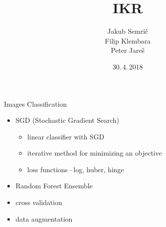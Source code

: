 \documentclass{beamer}
\title[]{IKR}
\author{Jakub Semrič \\ Filip Klembara \\ Peter Jareš}
\institute{Brno University of Technology \\ Faculty of Information Technology}
\date{30.\,4.\,2018}
\begin{document}
\begin{frame}
\titlepage
\end{frame}

\begin{frame}{Images Classification}
    \begin{itemize}
        \item SGD (Stochastic Gradient Search)
        \begin{itemize}
            \item linear classifier with SGD
            \item iterative method for minimizing an objective
            \item loss functions\,--\,log, huber, hinge
        \end{itemize}
        \item Random Forest Ensemble
        \item cross validation
        \item data augmentation
    \end{itemize}
\end{frame}
\end{document}
